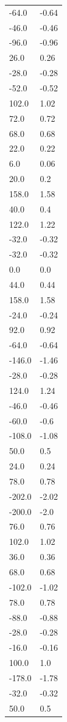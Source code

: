 \begin{longtable}{ll}
-64.0 & -0.64 \\
-46.0 & -0.46 \\
-96.0 & -0.96 \\
26.0 & 0.26 \\
-28.0 & -0.28 \\
-52.0 & -0.52 \\
102.0 & 1.02 \\
72.0 & 0.72 \\
68.0 & 0.68 \\
22.0 & 0.22 \\
6.0 & 0.06 \\
20.0 & 0.2 \\
158.0 & 1.58 \\
40.0 & 0.4 \\
122.0 & 1.22 \\
-32.0 & -0.32 \\
-32.0 & -0.32 \\
0.0 & 0.0 \\
44.0 & 0.44 \\
158.0 & 1.58 \\
-24.0 & -0.24 \\
92.0 & 0.92 \\
-64.0 & -0.64 \\
-146.0 & -1.46 \\
-28.0 & -0.28 \\
124.0 & 1.24 \\
-46.0 & -0.46 \\
-60.0 & -0.6 \\
-108.0 & -1.08 \\
50.0 & 0.5 \\
24.0 & 0.24 \\
78.0 & 0.78 \\
-202.0 & -2.02 \\
-200.0 & -2.0 \\
76.0 & 0.76 \\
102.0 & 1.02 \\
36.0 & 0.36 \\
68.0 & 0.68 \\
-102.0 & -1.02 \\
78.0 & 0.78 \\
-88.0 & -0.88 \\
-28.0 & -0.28 \\
-16.0 & -0.16 \\
100.0 & 1.0 \\
-178.0 & -1.78 \\
-32.0 & -0.32 \\
50.0 & 0.5 \\

\end{longtable}
